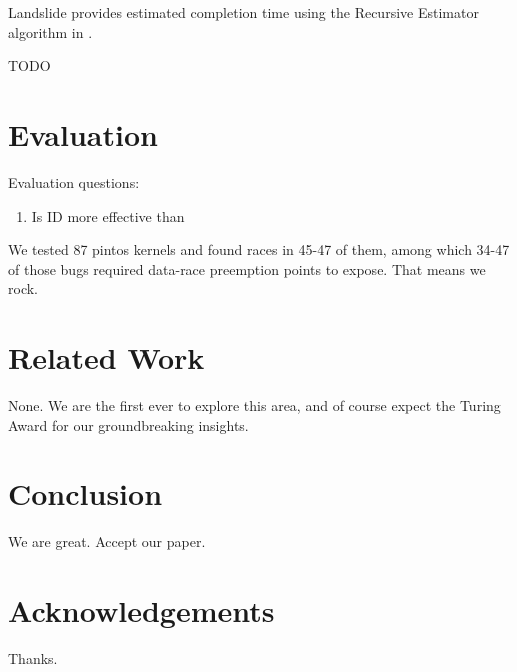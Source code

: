 \documentclass[pldi]{sigplanconf-pldi15}
\begin{document}
Landslide provides estimated completion time using the Recursive Estimator algorithm in \cite{estimation}.

TODO


\section{Evaluation}

Evaluation questions:
\begin{enumerate}
	\item Is ID more effective than 
\end{enumerate}


We tested 87 pintos kernels and found races in 45-47 of them, among which 34-47 of those bugs required data-race preemption points to expose. That means we rock.


\section{Related Work}

None. We are the first ever to explore this area, and of course expect the Turing Award for our groundbreaking insights.





\section{Conclusion}

We are
great. Accept our paper.


\section{Acknowledgements}

Thanks.


{}
\end{document}
